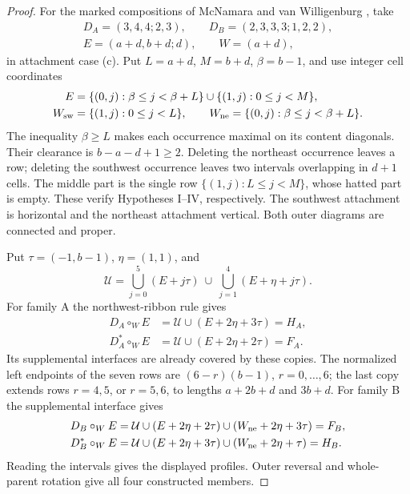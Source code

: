 \documentclass[11pt,a4paper]{amsart}
\numberwithin{equation}{section}
\theoremstyle{plain}
\theoremstyle{definition}
\begin{document}
\begin{proof}
For the marked compositions of McNamara and van Willigenburg
\cite{McNamara2009Classification}, take
\begin{equation}\label{eq:ten-chart}
 \begin{gathered}
 D_A=(3,4,4;2,3),\qquad D_B=(2,3,3,3;1,2,2),\\
 E=(a+d,b+d;d),\qquad W=(a+d),
 \end{gathered}
\end{equation}
in attachment case (c).  Put \(L=a+d\), \(M=b+d\),
\(\beta=b-1\), and use integer cell coordinates
\[
 \begin{aligned}
 E&=\{(0,j):\beta\le j<\beta+L\}\cup\{(1,j):0\le j<M\},\\
 W_{\rm sw}&=\{(1,j):0\le j<L\},\qquad
 W_{\rm ne}=\{(0,j):\beta\le j<\beta+L\}.
 \end{aligned}
\]
The inequality \(\beta\ge L\) makes each occurrence maximal on its
content diagonals.  Their clearance is \(b-a-d+1\ge2\).
Deleting the northeast occurrence leaves a row; deleting the southwest
occurrence leaves two intervals overlapping in \(d+1\) cells.
The middle part is the single row \(\{(1,j):L\le j<M\}\), whose
hatted part is empty.  These verify Hypotheses I--IV, respectively.
The southwest attachment is horizontal and the northeast attachment
vertical.  Both outer diagrams are connected and proper.

Put \(\tau=(-1,b-1)\), \(\eta=(1,1)\), and
\[
 \mathcal U=\bigcup_{j=0}^{5}(E+j\tau)
             \ \cup\ \bigcup_{j=1}^{4}(E+\eta+j\tau).
\]
For family A the northwest-ribbon rule gives
\begin{equation}\label{eq:ten-family-a-unions}
 \begin{aligned}
 D_A\circ_W E&=\mathcal U\cup(E+2\eta+3\tau)=H_A,\\
 D_A^*\circ_W E&=\mathcal U\cup(E+2\eta+2\tau)=F_A.
 \end{aligned}
\end{equation}
Its supplemental interfaces are already covered by these copies.
The normalized left endpoints of the seven rows are
\((6-r)(b-1)\), \(r=0,\ldots,6\); the last copy extends rows
\(r=4,5\), or \(r=5,6\), to lengths \(a+2b+d\) and \(3b+d\).
For family B the supplemental interface gives
\begin{equation}\label{eq:ten-cell-unions}
 \begin{aligned}
 D_B\circ_W E&=\mathcal U\cup(E+2\eta+2\tau)
                       \cup(W_{\rm ne}+2\eta+3\tau)=F_B,\\
 D_B^*\circ_W E&=\mathcal U\cup(E+2\eta+3\tau)
                       \cup(W_{\rm ne}+2\eta+\tau)=H_B.
 \end{aligned}
\end{equation}
Reading the intervals gives the displayed profiles.  Outer reversal
and whole-parent rotation give all four constructed members.


\end{proof}
\end{document}
